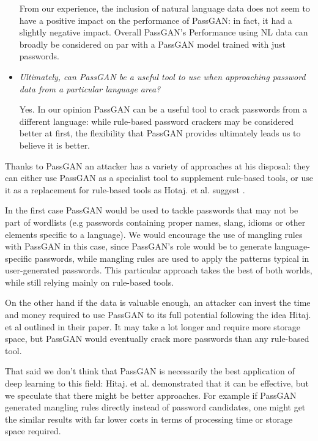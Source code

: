 \begin{itemize}
From our experience, the inclusion of natural language data does not seem to have a positive impact on the performance of PassGAN: in fact, it had a slightly negative impact. Overall PassGAN's Performance using NL data can broadly be considered on par with a PassGAN model trained with just passwords.
\clearpage 
\item \emph{Ultimately, can PassGAN be a useful tool to use when approaching password data from a particular language area?} %

Yes. In our opinion PassGAN can be a useful tool to crack passwords from a different language: while rule-based password crackers may be considered better at first, the flexibility that PassGAN provides ultimately leads us to believe it is better.

\end{itemize}
Thanks to PassGAN an attacker has a variety of approaches at his disposal: they can either use PassGAN as a specialist tool to supplement rule-based tools, or use it as a replacement for rule-based tools as Hotaj. et al. suggest \cite{PassGAN}. 

In the first case PassGAN would be used to tackle passwords that may not be part of wordlists (e.g passwords containing  proper names, slang, idioms or other elements specific to a language). 
We would encourage the use of mangling rules with PassGAN in this case, since  PassGAN's role would be to generate language-specific passwords, while mangling rules are used to apply the patterns typical in user-generated passwords. This particular approach takes the best of both worlds, while still relying mainly on rule-based tools.

On the other hand if the data is valuable enough, an attacker can invest the time and money required to use PassGAN to its full potential following the idea Hitaj. et al \cite{PassGAN} outlined in their paper. It may take a lot longer and require more storage space, but PassGAN would eventually crack more passwords than any rule-based tool.

That said we don't think that PassGAN is necessarily the best application of deep learning to this field: Hitaj. et al. demonstrated that it can be effective, but we speculate that there might be better approaches. For example if PassGAN generated mangling rules directly instead of password candidates, one might get the similar results with far lower costs in terms of processing time or storage space required.
